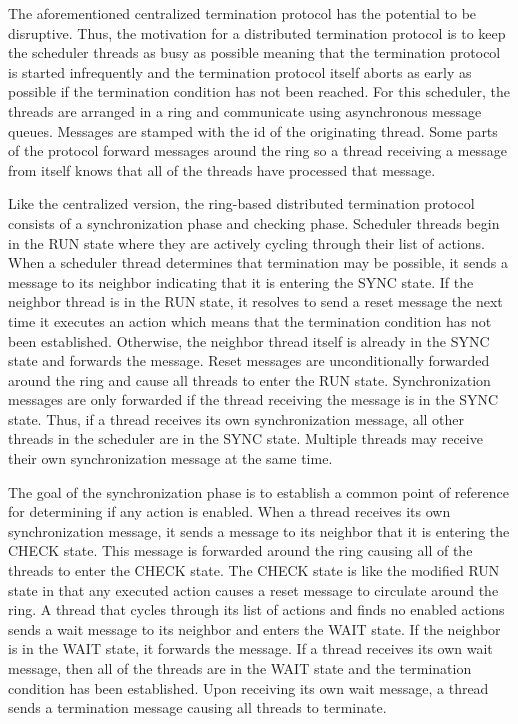 The aforementioned centralized termination protocol has the potential to be disruptive.
Thus, the motivation for a distributed termination protocol is to keep the scheduler threads as busy as possible meaning that the termination protocol is started infrequently and the termination protocol itself aborts as early as possible if the termination condition has not been reached.
For this scheduler, the threads are arranged in a ring and communicate using asynchronous message queues.
Messages are stamped with the id of the originating thread.
Some parts of the protocol forward messages around the ring so a thread receiving a message from itself knows that all of the threads have processed that message.

Like the centralized version, the ring-based distributed termination protocol consists of a synchronization phase and checking phase.
Scheduler threads begin in the RUN state where they are actively cycling through their list of actions.
When a scheduler thread determines that termination may be possible, it sends a message to its neighbor indicating that it is entering the SYNC state.
If the neighbor thread is in the RUN state, it resolves to send a reset message the next time it executes an action which means that the termination condition has not been established.
Otherwise, the neighbor thread itself is already in the SYNC state and forwards the message.
Reset messages are unconditionally forwarded around the ring and cause all threads to enter the RUN state.
Synchronization messages are only forwarded if the thread receiving the message is in the SYNC state.
Thus, if a thread receives its own synchronization message, all other threads in the scheduler are in the SYNC state.
Multiple threads may receive their own synchronization message at the same time.

The goal of the synchronization phase is to establish a common point of reference for determining if any action is enabled.
When a thread receives its own synchronization message, it sends a message to its neighbor that it is entering the CHECK state.
This message is forwarded around the ring causing all of the threads to enter the CHECK state.
The CHECK state is like the modified RUN state in that any executed action causes a reset message to circulate around the ring.
A thread that cycles through its list of actions and finds no enabled actions sends a wait message to its neighbor and enters the WAIT state.
If the neighbor is in the WAIT state, it forwards the message.
If a thread receives its own wait message, then all of the threads are in the WAIT state and the termination condition has been established.
Upon receiving its own wait message, a thread sends a termination message causing all threads to terminate.

